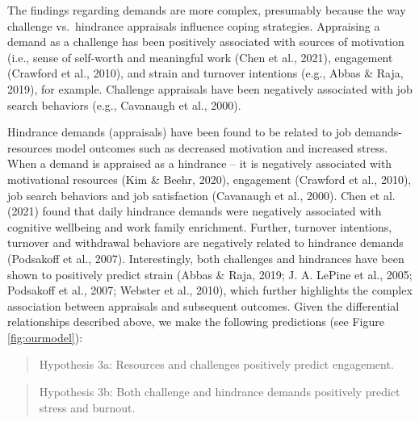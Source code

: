 \documentclass[
  man,mask]{apa7}
\begin{document}
The findings regarding demands are more complex, presumably because the way challenge vs.~hindrance appraisals influence coping strategies. Appraising a demand as a challenge has been positively associated with sources of motivation (i.e., sense of self-worth and meaningful work (Chen et al., 2021), engagement (Crawford et al., 2010), and strain and turnover intentions (e.g., Abbas \& Raja, 2019), for example. Challenge appraisals have been negatively associated with job search behaviors (e.g., Cavanaugh et al., 2000).

Hindrance demands (appraisals) have been found to be related to job demands-resources model outcomes such as decreased motivation and increased stress. When a demand is appraised as a hindrance -- it is negatively associated with motivational resources (Kim \& Beehr, 2020), engagement (Crawford et al., 2010), job search behaviors and job satisfaction (Cavanaugh et al., 2000). Chen et al. (2021) found that daily hindrance demands were negatively associated with cognitive wellbeing and work family enrichment. Further, turnover intentions, turnover and withdrawal behaviors are negatively related to hindrance demands (Podsakoff et al., 2007). Interestingly, both challenges and hindrances have been shown to positively predict strain (Abbas \& Raja, 2019; J. A. LePine et al., 2005; Podsakoff et al., 2007; Webster et al., 2010), which further highlights the complex association between appraisals and subsequent outcomes. Given the differential relationships described above, we make the following predictions (see Figure \ref{fig:ourmodel}):

\begin{quote}
Hypothesis 3a: Resources and challenges positively predict engagement.
\end{quote}

\begin{quote}
Hypothesis 3b: Both challenge and hindrance demands positively predict stress and burnout.
\end{quote}
\end{document}
